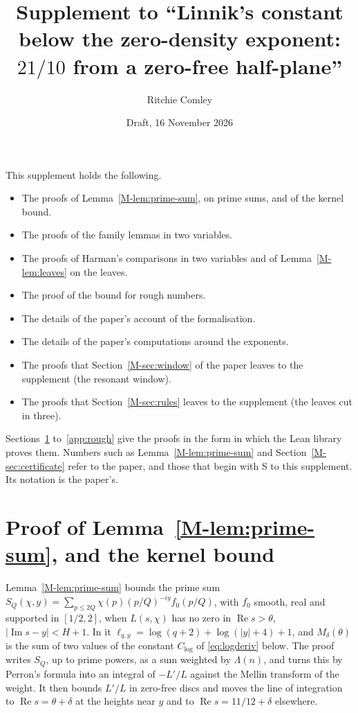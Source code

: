 \documentclass[11pt]{article}
\title{Supplement to ``Linnik's constant below the zero-density exponent: $21/10$ from a zero-free half-plane''}
\author{Ritchie Comley}
\date{Draft, 16 November 2026}
\numberwithin{equation}{section}
\begin{document}
\maketitle

This supplement holds the following.
\begin{itemize}
\item[{\ref{app:prime-sum}}] The proofs of Lemma~\ref{M-lem:prime-sum}, on prime sums, and of the kernel bound.
\item[{\ref{app:family}}] The proofs of the family lemmas in two variables.
\item[{\ref{app:harman}}] The proofs of Harman's comparisons in two variables and of Lemma~\ref{M-lem:leaves} on the
  leaves.
\item[{\ref{app:rough}}] The proof of the bound for rough numbers.
\item[{\ref{sup:lean}}] The details of the paper's account of the formalisation.
\item[{\ref{sup:computations}}] The details of the paper's computations around the exponents.
\item[{\ref{sup:window}}] The proofs that Section~\ref{M-sec:window} of the paper leaves to the supplement (the
  resonant window).
\item[{\ref{sup:leaves}}] The proofs that Section~\ref{M-sec:rules} leaves to the supplement (the leaves cut in three).
\end{itemize}
Sections~\ref{app:prime-sum} to~\ref{app:rough} give the proofs in the form in which the Lean library proves them.
Numbers such as Lemma~\ref{M-lem:prime-sum} and Section~\ref{M-sec:certificate} refer to the paper, and those that
begin with S to this supplement. Its notation is the paper's.

\section{Proof of Lemma~\ref{M-lem:prime-sum}, and the kernel bound}\label{app:prime-sum}

Lemma~\ref{M-lem:prime-sum} bounds the prime sum $S_Q(\chi, y) = \sum_{p \le 2Q} \chi(p) (p/Q)^{-iy} f_0(p/Q)$, with
$f_0$ smooth, real and supported in $[1/2, 2]$, when $L(s, \chi)$ has no zero in $\operatorname{Re} s > \theta$,
$|\operatorname{Im} s - y| < H + 1$. In it $\ell_{q, y} = \log(q + 2) + \log(|y| + 4) + 1$, and $M_\delta(\theta)$ is
the sum of two values of the constant $C_{\log}$ of \eqref{eq:logderiv} below. The proof writes $S_Q$, up to prime
powers, as a sum weighted by $\Lambda(n)$, and turns this by Perron's formula into an integral of $-L'/L$ against the
Mellin transform of the weight. It then bounds $L'/L$ in zero-free discs and moves the line of integration to
$\operatorname{Re} s = \theta + \delta$ at the heights near $y$ and to $\operatorname{Re} s = 11/12 + \delta$ elsewhere.
\end{document}
